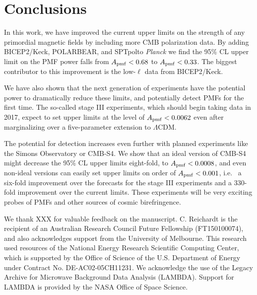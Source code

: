 \documentclass[preprint]{emulateapj}
\newcommand{\apmf}{\ensuremath{A_{\rm pmf}}}
\newcommand{\lcdm}{\ensuremath{\Lambda}CDM}
\newcommand{\planck}{{\sl Planck}}
\newcommand{\bicepkeck}{BICEP2/Keck}
\newcommand{\pb}{POLARBEAR}
\newcommand{\sptpol}{SPTpol}
\begin{document}
\section{Conclusions}
\label{sec:conclusions}

In this work, we have improved the current upper limits on the strength of any primordial magnetic fields by including more CMB polarization data. 
By adding \bicepkeck{}, \pb, and \sptpol to \planck{} we find the 95\% CL upper limit on the PMF power falls from $\apmf < 0.68$ to $\apmf < 0.33$. 
The biggest contributor to this improvement is the low-$\ell$ data from \bicepkeck{}. 

We have also shown that the next generation of experiments have the potential power to dramatically reduce these limits, and potentially detect PMFs for the first time. 
The so-called stage III experiments, which should begin taking data in 2017, expect to set upper limits at the level of $\apmf < 0.0062$ even after marginalizing over a five-parameter extension to \lcdm.

The potential for detection increases even further with planned experiments like the Simons Observatory or CMB-S4. 
We show that an ideal version of CMB-S4 might decrease the 95\% CL upper limits eight-fold, to $\apmf < 0.0008$, and even non-ideal versions can easily set upper limits on order of $\apmf < 0.001$, i.e.~ a six-fold improvement over the forecasts for the stage III experiments and a 330-fold improvement over the current limits. 
These experiments will be very exciting probes of PMFs and other sources of cosmic birefringence. 

\acknowledgments

We thank XXX for valuable feedback on the manuscript. 
C. Reichardt is the recipient of an Australian Research Council Future Fellowship (FT150100074), and also acknowledges support from the University of Melbourne. 
This research used resources of the National Energy Research Scientific Computing Center, which is supported by the Office of Science of the U.S. Department of Energy under Contract No. DE-AC02-05CH11231. 
We acknowledge the use of the Legacy Archive for Microwave Background Data Analysis (LAMBDA). Support for LAMBDA is provided by the NASA Office of Space Science.



\end{document}

